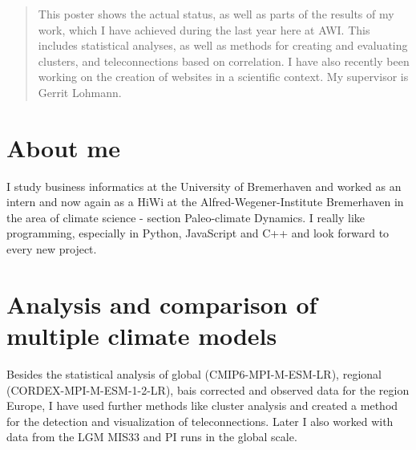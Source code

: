 \documentclass[a0,portrait]{a0poster}
\begin{document}
\begin{multicols}{3} %


\color{Navy} %

\begin{abstract}
This poster shows the actual status, as well as parts of the results of my work, which I have achieved during the last year here at AWI. This includes statistical analyses, as well as methods for creating and evaluating clusters, and teleconnections based on correlation. I have also recently been working on the creation of websites in a scientific context. My supervisor is Gerrit Lohmann.
\end{abstract}
\color{Black} %
\section*{\centering About me}
I study business informatics at the University of Bremerhaven and worked as an intern and now again as a \grqq{}HiWi\grqq{} at the Alfred-Wegener-Institute Bremerhaven in the area of climate science - section \grqq{}Paleo-climate Dynamics\grqq{}.
I really like programming, especially in Python, JavaScript and C++ and look forward to every new project.\\


\color{Black} %
\section{Analysis and comparison of multiple climate models}
Besides the statistical analysis of global (CMIP6-MPI-M-ESM-LR), regional (CORDEX-MPI-M-ESM-1-2-LR), bais corrected and observed data for the region Europe, I have used further methods like cluster analysis and created a method for the detection and visualization of teleconnections. Later I also worked with data from the LGM MIS33 and PI runs in the global scale. 


\end{multicols}
\end{document}
